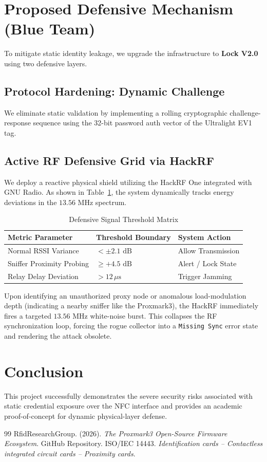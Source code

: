 \documentclass[sigconf]{acmart}
\begin{document}
\section{Proposed Defensive Mechanism (Blue Team)}
To mitigate static identity leakage, we upgrade the infrastructure to \textbf{Lock V2.0} using two defensive layers.

\subsection{Protocol Hardening: Dynamic Challenge}
We eliminate static validation by implementing a rolling cryptographic challenge-response sequence using the 32-bit password auth vector of the Ultralight EV1 tag.

\subsection{Active RF Defensive Grid via HackRF}
We deploy a reactive physical shield utilizing the HackRF One integrated with GNU Radio. As shown in Table~\ref{tab:defense_metrics}, the system dynamically tracks energy deviations in the $13.56\text{ MHz}$ spectrum.

\begin{table}[h]
\centering
\caption{Defensive Signal Threshold Matrix}
\label{tab:defense_metrics}
\footnotesize
\begin{tabular}{p{}p{}p{}}
\toprule
Metric Parameter & Threshold Boundary & System Action \\
\midrule
Normal RSSI Variance & $< \pm 2.1\text{ dB}$ & Allow Transmission \\
Sniffer Proximity Probing & $\ge +4.5\text{ dB}$ & Alert / Lock State \\
Relay Delay Deviation & $> 12\,\mu\text{s}$ & Trigger Jamming \\
\bottomrule
\end{tabular}
\end{table}

Upon identifying an unauthorized proxy node or anomalous load-modulation depth (indicating a nearby sniffer like the Proxmark3), the HackRF immediately fires a targeted $13.56\text{ MHz}$ white-noise burst. This collapses the RF synchronization loop, forcing the rogue collector into a \texttt{Missing Sync} error state and rendering the attack obsolete.

\section{Conclusion}
This project successfully demonstrates the severe security risks associated with static credential exposure over the NFC interface and provides an academic proof-of-concept for dynamic physical-layer defense. 

\begin{thebibliography}{99}
 RfidResearchGroup. (2026). \emph{The Proxmark3 Open-Source Firmware Ecosystem}. GitHub Repository.
 ISO/IEC 14443. \emph{Identification cards -- Contactless integrated circuit cards -- Proximity cards}.
\end{thebibliography}
\end{document}
